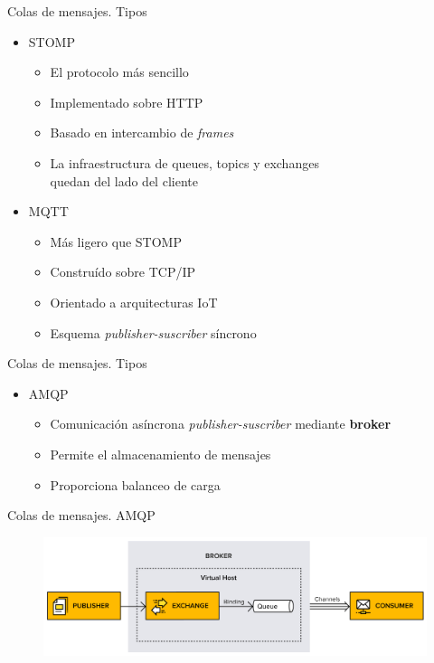 \documentclass{beamer}
\begin{document}
  \begin{frame}{Colas de mensajes. Tipos}
    \begin{itemize}
      \item STOMP
      \begin{itemize}
        \item El protocolo más sencillo
        \item Implementado sobre HTTP
        \item Basado en intercambio de \textit{frames}
        \item La infraestructura de queues, topics y exchanges\\
        quedan del lado del cliente
      \end{itemize}
      \item MQTT
      \begin{itemize}
        \item Más ligero que STOMP
        \item Construído sobre TCP/IP
        \item Orientado a arquitecturas IoT
        \item Esquema \textit{publisher-suscriber} síncrono
      \end{itemize}
    \end{itemize}
  \end{frame}

  \begin{frame}{Colas de mensajes. Tipos}
    \begin{itemize}
      \item AMQP
      \begin{itemize}
        \item Comunicación asíncrona \textit{publisher-suscriber} mediante \textbf{broker}
        \item Permite el almacenamiento de mensajes
        \item Proporciona balanceo de carga
      \end{itemize}
    \end{itemize}
  \end{frame}

  \begin{frame}[plain]{Colas de mensajes. AMQP}
    \begin{figure}
      \includegraphics[width=\textwidth]{amq_concepts.png}
    \end{figure}
  \end{frame}
\end{document}
